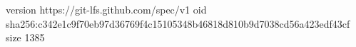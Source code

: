 version https://git-lfs.github.com/spec/v1
oid sha256:c342e1c9f70eb97d36769f4c15105348b46818d810b9d7038cd56a423edf43cf
size 1385
